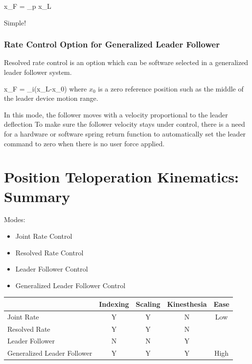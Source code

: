 \bq
\Delta x_F = \lambda_p \Delta x_L
\eq

Simple!




\subsubsection{Rate Control Option for Generalized Leader Follower}


Resolved rate control is an option which can be software selected in a generalized leader follower system.	%

\bq
\Delta x_F = \alpha_i(x_L-x_0)
\eq
where $x_0$ is a zero reference position such as the middle of the leader device motion range.	%

In this mode, the follower moves with a velocity proportional to the leader deflection
To make sure the follower velocity stays under control, there is a need
for a hardware or software spring return function to automatically set the leader
command to zero when there is no user force applied. 


\section{Position Teloperation Kinematics: Summary}

Modes:

\begin{itemize}
	\item Joint Rate Control
	\item Resolved Rate Control
	\item Leader Follower Control
	\item Generalized Leader Follower Control
\end{itemize}


\begin{tabular}{l|cccc}
                & Indexing         & Scaling        & Kinesthesia      & Ease   \\ \hline
Joint Rate      &    Y             &   Y            &    N             &  Low     \\
Resolved Rate   &    Y             &   Y            &    N             &        \\
Leader Follower    &    N             &   N            &    Y             &        \\
Generalized Leader Follower
                &    Y             &   Y            &    Y             & High  \\ \hline
\end{tabular}






